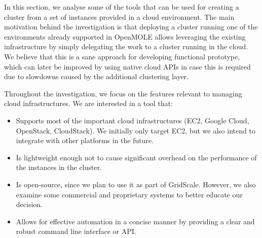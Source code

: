 In this section, we analyse some of the tools that can be used for creating a cluster from a set of instances provided in a cloud environment. The main motivation behind the investigation is that deploying a cluster running one of the environments already supported in OpenMOLE allows leveraging the existing infrastructure by simply delegating the work to a cluster running in the cloud. We believe that this is a sane approach for developing functional prototype, which can later be improved by using native cloud APIs in case this is required due to slowdowns caused by the additional clustering layer.

Throughout the investigation, we focus on the features relevant to managing cloud infrastructures. We are interested in a tool that:
\begin{itemize}
	\item Supports most of the important cloud infrastructures (EC2, Google Cloud, OpenStack, CloudStack). We initially only target EC2, but we also intend to integrate with other platforms in the future.
	\item Is lightweight enough not to cause significant overhead on the performance of the instances in the cluster.
	\item Is open-source, since we plan to use it as part of GridScale. However, we also examine some commercial and proprietary systems to better educate our decision.
	\item Allows for effective automation in a concise manner by providing a clear and robust command line interface or API.
\end{itemize}





